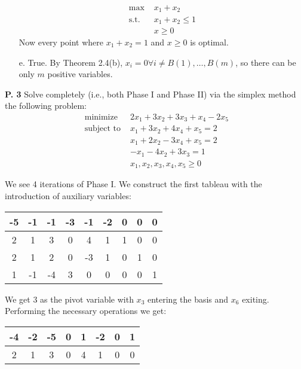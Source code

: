 \documentclass{article}
\begin{document}
\begin{jacklist}
\begin{itemize}
\begin{align*}
                \text{max } & x_1 + x_2 \\
                \text{s.t. } & x_1 + x_2 \leq 1 \\
                            &x \geq 0
            \end{align*} 
            Now every point where $x_1 + x_2 = 1$ and $x \geq 0$ is optimal. 
        \item [e.] True. By Theorem 2.4(b), $x_i = 0 \forall i \neq B(1),\ldots,B(m)$, so there can be only $m$ positive variables. 
    \end{itemize}
\newpage
    \begin{framed} 
    \item [\textbf{P. 3}] Solve completely (i.e., both Phase I and Phase II) via the simplex method the following problem: 
    \[ 
        \begin{array}{rc}
        \text { minimize } & 2 x_{1}+3 x_{2}+3 x_{3}+x_{4}-2 x_{5} \\
        \text { subject to } & x_{1}+3 x_{2}+4 x_{4}+x_{5}=2 \\
        & x_{1}+2 x_{2}-3 x_{4}+x_{5}=2 \\
        & -x_{1}-4 x_{2}+3 x_{3}=1 \\
        & x_{1}, x_{2}, x_{3}, x_{4}, x_{5} \geq 0
        \end{array}
    \] 
    \end{framed}
    We see 4 iterations of Phase I. We construct the first tableau with the introduction of auxiliary variables: 
    \begin{center}
        \begin{tabular}{|c|cccccccc|}
            \hline
            -5&-1&-1&-3&-1&-2&0&0&0\\
            \hline
            2&1&3&0&4&1&1&0&0\\
            2&1&2&0&-3&1&0&1&0\\
            1&-1&-4&3&0&0&0&0&1\\
            \hline
        \end{tabular}
    \end{center}
    We get 3 as the pivot variable with $x_3$ entering the basis and $x_6$ exiting. Performing the necessary operations we get:
    \begin{center}
        \begin{tabular}{|c|ccccccc|}
            \hline
            -4&-2&-5&0&1&-2&0&1\\
            \hline
            2&1&3&0&4&1&0&0\\

\end{tabular}
\end{center}
\end{jacklist}
\end{document}
